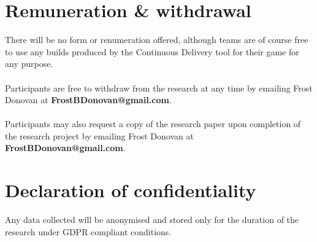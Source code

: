 \documentclass{article}
\begin{document}
        \newpage

    \section{Remuneration \& withdrawal}
        There will be no form or renumeration offered, although teams are of course free to use any builds produced by the Continuous Delivery tool for their game for any purpose.
        \\ \\
        Participants are free to withdraw from the research at any time by emailing Frost Donovan at \textbf{FrostBDonovan@gmail.com}. 
        \\ \\
        Participants may also request a copy of the research paper upon completion of the research project by emailing Frost Donovan at \textbf{FrostBDonovan@gmail.com}.
        
    \section{Declaration of confidentiality}
        Any data collected will be anonymised and stored only for the duration of the research under GDPR compliant conditions.
\end{document}
